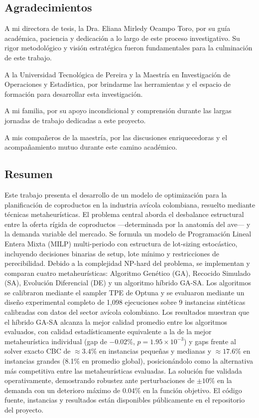 \documentclass[
  spanish,
  12pt,
]{article}
\begin{document}
\newpage

\subsection{Agradecimientos}\label{agradecimientos}

A mi directora de tesis, la Dra. Eliana Mirledy Ocampo Toro, por su guía
académica, paciencia y dedicación a lo largo de este proceso
investigativo. Su rigor metodológico y visión estratégica fueron
fundamentales para la culminación de este trabajo.

A la Universidad Tecnológica de Pereira y la Maestría en Investigación
de Operaciones y Estadística, por brindarme las herramientas y el
espacio de formación para desarrollar esta investigación.

A mi familia, por su apoyo incondicional y comprensión durante las
largas jornadas de trabajo dedicadas a este proyecto.

A mis compañeros de la maestría, por las discusiones enriquecedoras y el
acompañamiento mutuo durante este camino académico.

\newpage

\subsection{Resumen}\label{resumen}

Este trabajo presenta el desarrollo de un modelo de optimización para la
planificación de coproductos en la industria avícola colombiana,
resuelto mediante técnicas metaheurísticas. El problema central aborda
el desbalance estructural entre la oferta rígida de coproductos
---determinada por la anatomía del ave--- y la demanda variable del
mercado. Se formula un modelo de Programación Lineal Entera Mixta (MILP)
multi-periodo con estructura de lot-sizing estocástico, incluyendo
decisiones binarias de setup, lote mínimo y restricciones de
perecibilidad. Debido a la complejidad NP-hard del problema, se
implementan y comparan cuatro metaheurísticas: Algoritmo Genético (GA),
Recocido Simulado (SA), Evolución Diferencial (DE) y un algoritmo
híbrido GA-SA. Los algoritmos se calibraron mediante el sampler TPE de
Optuna y se evaluaron mediante un diseño experimental completo de 1,098
ejecuciones sobre 9 instancias sintéticas calibradas con datos del
sector avícola colombiano. Los resultados muestran que el híbrido GA-SA
alcanza la mejor calidad promedio entre los algoritmos evaluados, con
calidad estadísticamente equivalente a la de la mejor metaheurística
individual (gap de \(-0.02\%\), \(p = 1.95 \times 10^{-3}\)) y gaps
frente al solver exacto CBC de \(\approx 3.4\%\) en instancias pequeñas
y medianas y \(\approx 17.6\%\) en instancias grandes (8.1\% en promedio
global), posicionándolo como la alternativa más competitiva entre las
metaheurísticas evaluadas. La solución fue validada operativamente,
demostrando robustez ante perturbaciones de \(\pm 10\%\) en la demanda
con un deterioro máximo de \(0.04\%\) en la función objetivo. El código
fuente, instancias y resultados están disponibles públicamente en el
repositorio del proyecto.
\end{document}
